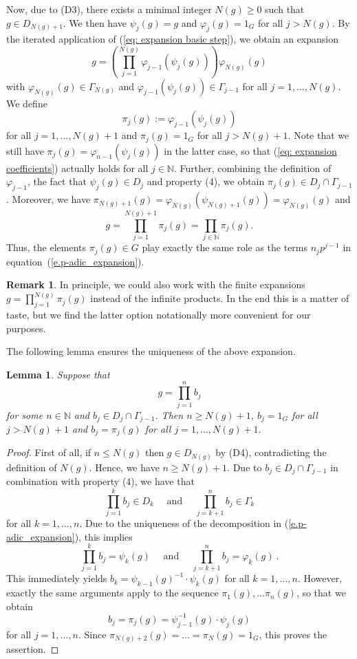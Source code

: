 \documentclass[titlepage,reqno,10pt]{amsart}
\newtheorem{lemma}[theorem]{Lemma}
\theoremstyle{definition}
\newtheorem{remark}[theorem]{Remark}
\def\N{{\mathbb N}}
\begin{document}
Now, due to (D3), there exists a minimal integer $N(g)\geq 0$ such that $g\in D_{N(g)+1}$. We then have $\psi_j(g)=g$ and $\varphi_j(g)=1_G$ for all $j>N(g)$. By the iterated application of (\ref{eq: expansion basic step}), we obtain an expansion 
$$ g = \left(\prod_{j=1}^{N(g)} \varphi_{j-1}(\psi_j(g))\right)\varphi_{N(g)}(g) $$
with $\varphi_{N(g)}(g)\in\Gamma_{N(g)}$ and $\varphi_{j-1}(\psi_j(g))\in\Gamma_{j-1}$ for all $j=1,\ldots,N(g)$. 
We define
\begin{equation} \label{eq: expansion coefficients}
\pi_j(g) := \varphi_{j-1}(\psi_j(g))  
\end{equation}
for all $j=1,\ldots,N(g)+1$ and $\pi_j(g)=1_G$ for all $j>N(g)+1$. Note that we still have $\pi_j(g)=\varphi_{n-1}(\psi_j(g))$ in the latter case, so that (\ref{eq: expansion coefficients}) actually holds for all $j\in\N$. Further, combining the definition of $\varphi_{j-1}$, the fact that $\psi_j(g)\in D_j$ and property (4), we obtain $\pi_j(g)\in D_j\cap \Gamma_{j-1}$. Moreover, we have $\pi_{N(g)+1}(g)=\varphi_{N(g)}(\psi_{N(g)+1}(g))=\varphi_{N(g)}(g)$ and
$$
g=\prod_{j=1}^{N(g)+1} \pi_j(g) = \prod_{j\in\N} \pi_j(g). $$
Thus, the elements $\pi_j(g)\in G$ play exactly the same role as the terms $n_jp^{j-1}$ in equation~(\ref{e.p-adic_expansion}).
\begin{remark}
In principle, we could also work with the finite expansions $g=\prod_{j=1}^{N(g)} \pi_j(g)$ instead of the infinite products. In the end this is a matter of taste, but we find the latter option notationally more convenient for our purposes. 
\end{remark}
The following lemma ensures the uniqueness of the above expansion. 
\begin{lemma} \label{eq: uniqueness of expansion}
    Suppose that 
    $$
    g=\prod_{j=1}^n b_j
    $$
    for some $n\in\N$ and $b_j\in D_j\cap \Gamma_{j-1}$. Then $n\geq N(g)+1$, $b_j=1_G$ for all $j>N(g)+1$ and $b_j=\pi_j(g)$ for all $j=1,\ldots , N(g)+1$. 
\end{lemma}
\begin{proof}
First of all, if $n\leq N(g)$ then $g\in D_{N(g)}$ by (D4), contradicting the definition of $N(g)$. Hence, we have $n\geq N(g)+1$. 
Due to $b_j\in D_j\cap \Gamma_{j-1}$ in combination with property (4), we have that 
$$
\prod_{j=1}^k b_j \in D_k \quad \textrm{ and } \quad \prod_{j=k+1}^n b_j \in \Gamma_k$$
for all $k=1,\ldots,n$. Due to the uniqueness of the decomposition in (\ref{e.p-adic_expansion}), this implies 
$$
\prod_{j=1}^k b_j =\psi_k(g) \quad \textrm{ and } \quad \prod_{j=k+1}^n b_j =\varphi_k(g) \ . 
$$
This immediately yields $b_k=\psi_{k-1}(g)^{-1}\cdot \psi_k(g)$ for all $k=1,\ldots, n$.
However, exactly the same arguments apply to the sequence $\pi_1(g),\ldots \pi_{n}(g)$, so that we obtain  
\begin{equation}\label{eq: expansion alternative}
b_j=\pi_j(g)=\psi_{j-1}^{-1}(g)\cdot \psi_j(g) 
\end{equation}
for all $j=1,\ldots,n$. Since $\pi_{N(g)+2}(g)=\ldots=\pi_N(g)=1_G$, this proves the assertion. 
\end{proof}
\end{document}
